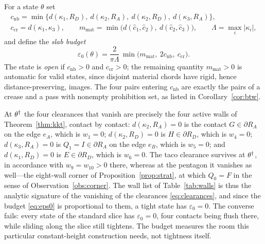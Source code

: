 \begin{definition}\label{def:clearance}
For a state $\theta$ set
\begin{equation}\label{eq:clearances}
\begin{gathered}
  c_{\mathrm{nb}}=\min\bigl\{d(\kappa_1,R_D),\ d(\kappa_2,R_A),\ d(\kappa_2,R_D),\ d(\kappa_3,R_A)\bigr\},\\
  c_{\mathrm{cr}}=d(\kappa_1,\kappa_3),\qquad
  m_{\mathrm{mat}}=\min\bigl(d(\hat c_1,\hat c_2),\ d(\hat c_2,\hat c_3)\bigr),\qquad
  \Lambda=\max_i\lvert\kappa_i\rvert ,
\end{gathered}
\end{equation}
and define the \emph{slab budget}
\begin{equation}\label{eq:eps0}
  \varepsilon_0(\theta)=\frac2{\pi\Lambda}\,\min\bigl(m_{\mathrm{mat}},\ 2c_{\mathrm{nb}},\ c_{\mathrm{cr}}\bigr).
\end{equation}
The state is \emph{open} if $c_{\mathrm{nb}}>0$ and $c_{\mathrm{cr}}>0$; the remaining quantity $m_{\mathrm{mat}}>0$ is automatic for valid states, since disjoint material chords have rigid, hence distance-preserving, images. The four pairs entering $c_{\mathrm{nb}}$ are exactly the pairs of a crease and a pass with nonempty prohibition set, as listed in Corollary~\ref{cor:btw}.
\end{definition}

\begin{observation}\label{obs:budget}
At $\theta^\dagger$ the four clearances that vanish are precisely the four active walls of Theorem~\ref{thm:kkt}, contact by contact: $d(\kappa_2,R_A)=0$ is the contact $G\in\partial R_A$ on the edge $e_A$, which is $w_1=0$; $d(\kappa_2,R_D)=0$ is $H\in\partial R_D$, which is $w_4=0$; $d(\kappa_3,R_A)=0$ is $Q_1=I\in\partial R_A$ on the edge $e_B$, which is $w_5=0$; and $d(\kappa_1,R_D)=0$ is $E\in\partial R_D$, which is $w_6=0$. The taco clearance survives at $\theta^\dagger$, in accordance with $w_9=w_{10}>0$ there, whereas at the pentagon it vanishes as well---the eight-wall corner of Proposition~\ref{prop:strat}, at which $Q_0=F$ in the sense of Observation~\ref{obs:corner}. The wall list of Table~\ref{tab:walls} is thus the analytic signature of the vanishing of the clearances \eqref{eq:clearances}, and since the budget \eqref{eq:eps0} is proportional to them, a tight state has $\varepsilon_0=0$. The converse fails: every state of the standard slice has $\varepsilon_0=0$, four contacts being flush there, while sliding along the slice still tightens. The budget measures the room this particular constant-height construction needs, not tightness itself.
\end{observation}

